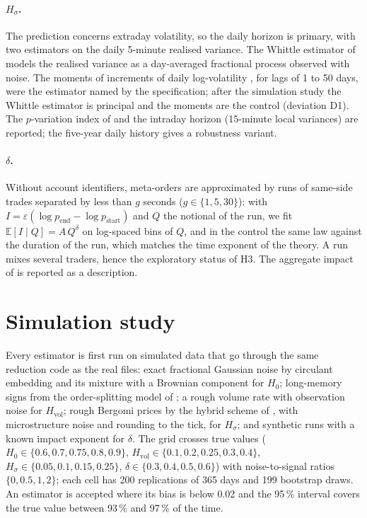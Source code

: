 \documentclass[11pt]{article}
\newcommand{\Hz}{H_0}
\newcommand{\Hv}{H_{\mathrm{vol}}}
\newcommand{\Hs}{H_\sigma}
\newcommand{\E}{\mathbb{E}}
\begin{document}
\paragraph{$\Hs$.} The prediction concerns extraday volatility, so the daily horizon is
primary, with two estimators on the daily 5-minute realised variance. The Whittle
estimator of \citet{fukasawa2022} models the realised variance as a day-averaged
fractional process observed with noise. The moments of increments of daily
log-volatility \citep{gatheral2018}, for lags of 1 to 50 days, were the estimator named by
the specification; after the simulation study the Whittle estimator is principal and the
moments are the control (deviation D1). The $p$-variation index of \citet{contdas2024}
and the intraday horizon (15-minute local variances) are reported; the five-year daily
history gives a robustness variant.

\paragraph{$\delta$.} Without account identifiers, meta-orders are approximated by runs of
same-side trades separated by less than $g$ seconds ($g\in\{1,5,30\}$): with
$I=\varepsilon(\log p_{\text{end}}-\log p_{\text{start}})$ and $Q$ the notional of the run,
we fit $\E[I\mid Q]=A\,Q^{\delta}$ on log-spaced bins of $Q$, and in the control the same law
against the duration of the run, which matches the time exponent of the theory. A run mixes
several traders, hence the exploratory status of H3. The aggregate impact of
\citet{patzelt2018} is reported as a description.

\section{Simulation study}
\label{sec:simulation}
Every estimator is first run on simulated data that go through the same reduction code as
the real files: exact fractional Gaussian noise by circulant embedding
\citep{daviesharte1987} and its mixture with a Brownian component for $\Hz$;
long-memory signs from the order-splitting model of \citet{lmf2005}; a rough volume rate
with observation noise for $\Hv$; rough Bergomi prices by the hybrid scheme of
\citet{bennedsen2017}, with microstructure noise and rounding to the tick, for $\Hs$; and
synthetic runs with a known impact exponent for $\delta$. The grid crosses true values
($\Hz\in\{0.6,0.7,0.75,0.8,0.9\}$, $\Hv\in\{0.1,0.2,0.25,0.3,0.4\}$,
$\Hs\in\{0.05,0.1,0.15,0.25\}$, $\delta\in\{0.3,0.4,0.5,0.6\}$) with noise-to-signal ratios
$\{0,0.5,1,2\}$; each cell has 200 replications of 365 days and 199 bootstrap draws.
An estimator is accepted where its bias is below 0.02 and the 95\,\% interval covers the
true value between 93\,\% and 97\,\% of the time.
\end{document}
